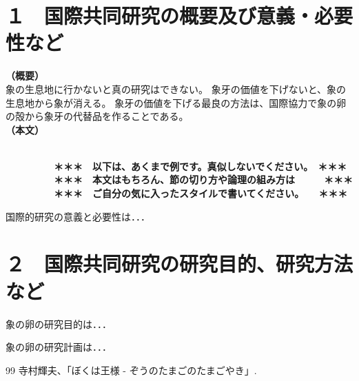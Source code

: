 \documentclass[11pt,a4j,dvipdfmx]{jarticle} 					%
\newcommand{\研究課題名}{象の卵}
\newcommand{\研究機関名}{逢坂大学}
\newcommand{\研究代表者氏名}{湯川秀樹}
\newcommand{\研究期間の最終元号年度}{9}  %
\begin{document}

\section{１　国際共同研究の概要及び意義・必要性など}

\noindent
\textbf{（概要）}\\
	象の生息地に行かないと真の研究はできない。
	象牙の価値を下げないと、象の生息地から象が消える。
	象牙の価値を下げる最良の方法は、国際協力で象の卵の殻から象牙の代替品を作ることである。
\\

\noindent
\textbf{（本文）}\\
\JSPSInstructions	%

\textbf{\\　　　　　＊＊＊　以下は、あくまで例です。真似しないでください。　＊＊＊\\
　　　　　＊＊＊　本文はもちろん、節の切り方や論理の組み方は　　　＊＊＊\\
　　　　　＊＊＊　ご自分の気に入ったスタイルで書いてください。　　＊＊＊}

	国際的研究の意義と必要性は．．．




\section{２　国際共同研究の研究目的、研究方法など}

	 象の卵の研究目的は．．．

	象の卵の研究計画は．．．

	\vspace{1cm}
	\begin{thebibliography}{99}
		 寺村輝夫、「ぼくは王様 - ぞうのたまごのたまごやき」.
	\end{thebibliography}
\end{document}
